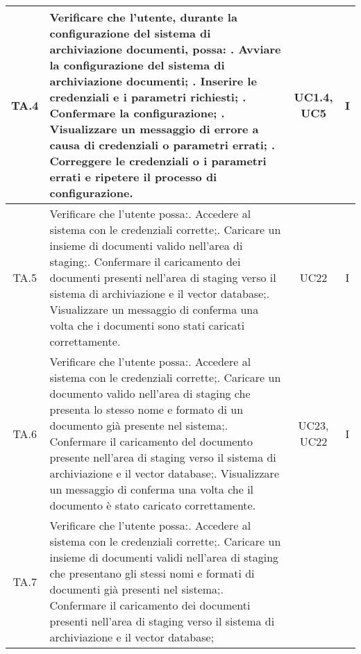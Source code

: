 {{{{{{{{\begin{xltabular}{\textwidth}{|c|X|c|c|}
    \hline
    TA.4 & Verificare che l'utente, durante la configurazione del sistema di archiviazione documenti, possa: . Avviare la configurazione del sistema di archiviazione documenti; . Inserire le credenziali e i parametri richiesti; . Confermare la configurazione; . Visualizzare un messaggio di errore a causa di credenziali o parametri errati; . Correggere le credenziali o i parametri errati e ripetere il processo di configurazione. & UC1.4, UC5 & I \\
    \hline
    TA.5 & Verificare che l'utente possa:. Accedere al sistema con le credenziali corrette;. Caricare un insieme di documenti valido nell'area di staging;. Confermare il caricamento dei documenti presenti nell'area di staging verso il sistema di archiviazione e il vector database;. Visualizzare un messaggio di conferma una volta che i documenti sono stati caricati correttamente. & UC22 & I \\
    \hline
    TA.6 & Verificare che l'utente possa:. Accedere al sistema con le credenziali corrette;. Caricare un documento valido nell'area di staging che presenta lo stesso nome e formato di un documento già presente nel sistema;. Confermare il caricamento del documento presente nell'area di staging verso il sistema di archiviazione e il vector database;. Visualizzare un messaggio di conferma una volta che il documento è stato caricato correttamente. & UC23, UC22 & I \\
    \hline
    TA.7 & Verificare che l'utente possa:. Accedere al sistema con le credenziali corrette;. Caricare un insieme di documenti validi nell'area di staging che presentano gli stessi nomi e formati di documenti già presenti nel sistema;. Confermare il caricamento dei documenti presenti nell'area di staging verso il sistema di archiviazione e il vector database;\newline

\end{xltabular}}}}}}}}}
